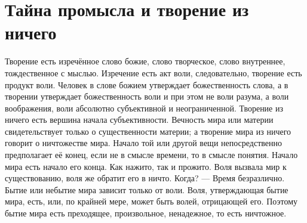 \documentclass[12pt,oneside]{book}
\begin{document}
\chapter{Тайна промысла и творение из ничего}


Творение есть изречённое слово божие, слово творческое, слово внутреннее, тождественное с мыслью. Изречение есть акт воли, следовательно, творение есть продукт воли. Человек в слове божием утверждает божественность слова, а в творении утверждает божественность воли и при этом не воли разума, а воли воображения, воли абсолютно субъективной и неограниченной. Творение из ничего есть вершина начала субъективности. Вечность мира или материи свидетельствует только о существенности материи; а творение мира из ничего говорит о ничтожестве мира. Начало той или другой вещи непосредственно предполагает её конец, если не в смысле времени, то в смысле понятия. Начало мира есть начало его конца. Как нажито, так и прожито. Воля вызвала мир к существованию, воля же обратит его в ничто. Когда? --- Время безразлично. Бытие или небытие мира зависит только от воли. Воля, утверждающая бытие мира, есть, или, по крайней мере, может быть волей, отрицающей его. Поэтому бытие мира есть преходящее, произвольное, ненадежное, то есть ничтожное.
\end{document}
